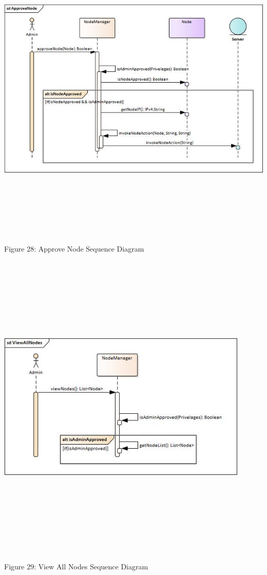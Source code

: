    \includegraphics[width=15cm,height=15cm,keepaspectratio]{admin_ui/images/sequence_diagrams/ApproveNode.jpg}
	\begin{center}
	    \small{Figure 28: Approve Node Sequence Diagram}
    \end{center}
    
    \includegraphics[width=12cm,height=15cm,keepaspectratio]{admin_ui/images/sequence_diagrams/ViewAllNodes.jpg}
	\begin{center}
	    \small{Figure 29: View All Nodes Sequence Diagram}
    \end{center}
    
